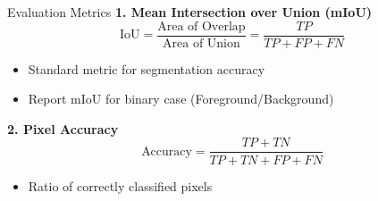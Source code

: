 \documentclass[aspectratio=169]{beamer}
\begin{document}
\begin{frame}{Evaluation Metrics}
\textbf{1. Mean Intersection over Union (mIoU)}
\begin{equation}
\text{IoU} = \frac{\text{Area of Overlap}}{\text{Area of Union}} = \frac{TP}{TP + FP + FN}
\end{equation}
\begin{itemize}
    \item Standard metric for segmentation accuracy
    \item Report mIoU for binary case (Foreground/Background)
\end{itemize}
\vspace{0.5cm}
\textbf{2. Pixel Accuracy}
\begin{equation}
\text{Accuracy} = \frac{TP + TN}{TP + TN + FP + FN}
\end{equation}
\begin{itemize}
    \item Ratio of correctly classified pixels
\end{itemize}
\end{frame}
\end{document}
